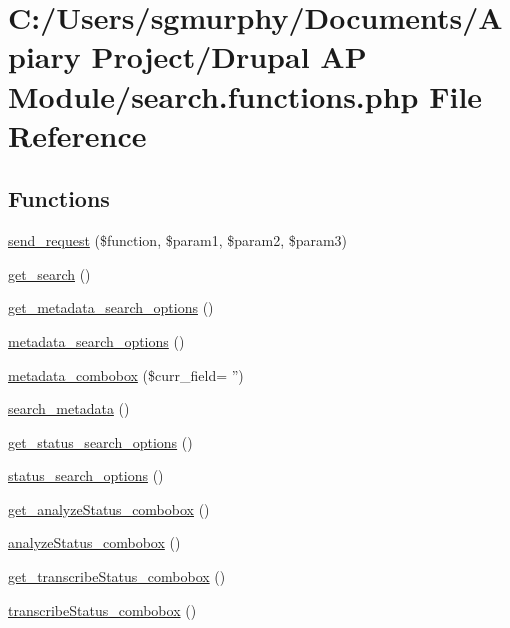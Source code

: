 \hypertarget{search_8functions_8php}{
\section{C:/Users/sgmurphy/Documents/Apiary Project/Drupal AP Module/search.functions.php File Reference}
\label{search_8functions_8php}
}
\subsection*{Functions}
\begin{DoxyCompactItemize}
\item 
\hyperlink{search_8functions_8php_a78bd2c85ad1dcdc1fb68e40605d593b0}{send\_\-request} (\$function, \$param1, \$param2, \$param3)
\item 
\hyperlink{search_8functions_8php_ad070411c3e0f82ab8f3f9cebdea1dd6a}{get\_\-search} ()
\item 
\hyperlink{search_8functions_8php_a1ea6f95533a64c01b6d8a294a22b367e}{get\_\-metadata\_\-search\_\-options} ()
\item 
\hyperlink{search_8functions_8php_ad3b79112dc41cc34b986c4f462609425}{metadata\_\-search\_\-options} ()
\item 
\hyperlink{search_8functions_8php_ad1edff4b206d5592ad22c8609e8e453f}{metadata\_\-combobox} (\$curr\_\-field= '')
\item 
\hyperlink{search_8functions_8php_af16b87b19a80e27adc34631fcf8dc679}{search\_\-metadata} ()
\item 
\hyperlink{search_8functions_8php_a5d1a3df4c9bf841aa94fe6f4b8b84b22}{get\_\-status\_\-search\_\-options} ()
\item 
\hyperlink{search_8functions_8php_ae8e41e2bb51042ca85a9079cbfac904c}{status\_\-search\_\-options} ()
\item 
\hyperlink{search_8functions_8php_a3d0d025469031fbff024e8c147bae9b9}{get\_\-analyzeStatus\_\-combobox} ()
\item 
\hyperlink{search_8functions_8php_a9c6395393919f0f0803a3645193ab4bf}{analyzeStatus\_\-combobox} ()
\item 
\hyperlink{search_8functions_8php_a659ab8660fbcf76342bfcfece2c26d28}{get\_\-transcribeStatus\_\-combobox} ()
\item 
\hyperlink{search_8functions_8php_a3faf33f802668cbc4feb92a9df27f2b1}{transcribeStatus\_\-combobox} ()
\item 

\end{DoxyCompactItemize}

